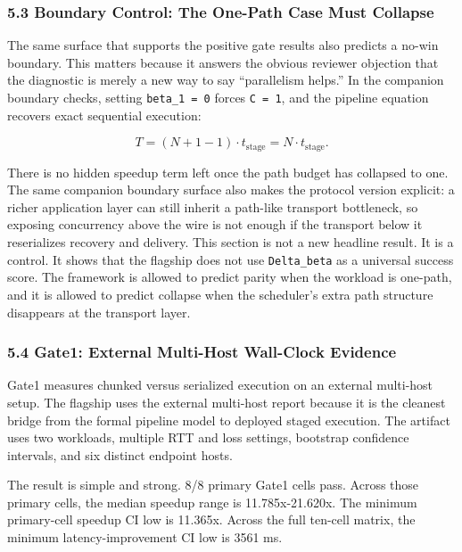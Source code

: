\documentclass[
  11pt,
]{article}
\begin{document}
\subsubsection{5.3 Boundary Control: The One-Path Case Must
Collapse}\label{boundary-control-the-one-path-case-must-collapse}

The same surface that supports the positive gate results also predicts a
no-win boundary. This matters because it answers the obvious reviewer
objection that the diagnostic is merely a new way to say ``parallelism
helps.'' In the companion boundary checks, setting
\texttt{beta\_1\ =\ 0} forces \texttt{C\ =\ 1}, and the pipeline
equation recovers exact sequential execution:

\[
T = (N + 1 - 1) \cdot t_{\mathrm{stage}} = N \cdot t_{\mathrm{stage}}.
\]

There is no hidden speedup term left once the path budget has collapsed
to one. The same companion boundary surface also makes the protocol
version explicit: a richer application layer can still inherit a
path-like transport bottleneck, so exposing concurrency above the wire
is not enough if the transport below it reserializes recovery and
delivery. This section is not a new headline result. It is a control. It
shows that the flagship does not use \texttt{Delta\_beta} as a universal
success score. The framework is allowed to predict parity when the
workload is one-path, and it is allowed to predict collapse when the
scheduler's extra path structure disappears at the transport layer.

\subsubsection{5.4 Gate1: External Multi-Host Wall-Clock
Evidence}\label{gate1-external-multi-host-wall-clock-evidence}

Gate1 measures chunked versus serialized execution on an external
multi-host setup. The flagship uses the external multi-host report
because it is the cleanest bridge from the formal pipeline model to
deployed staged execution. The artifact uses two workloads, multiple RTT
and loss settings, bootstrap confidence intervals, and six distinct
endpoint hosts.

The result is simple and strong. 8/8 primary Gate1 cells pass. Across
those primary cells, the median speedup range is 11.785x-21.620x. The
minimum primary-cell speedup CI low is 11.365x. Across the full ten-cell
matrix, the minimum latency-improvement CI low is 3561 ms.
\end{document}

